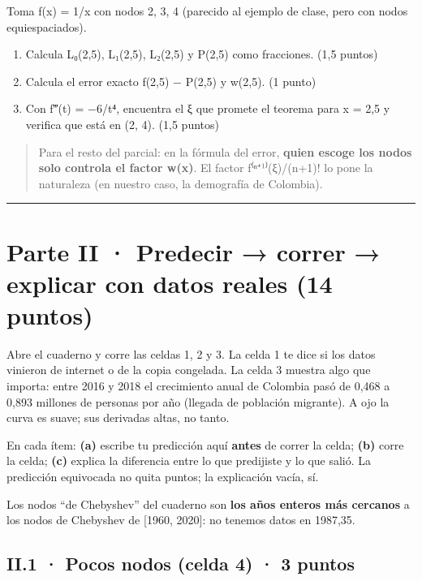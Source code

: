Toma f(x) = 1/x con nodos 2, 3, 4 (parecido al ejemplo de clase, pero con nodos equiespaciados).

\begin{enumerate}
\def\labelenumi{(\alph{enumi})}
\item
  Calcula L₀(2,5), L₁(2,5), L₂(2,5) y P(2,5) como fracciones. (1,5 puntos)
\item
  Calcula el error exacto f(2,5) − P(2,5) y w(2,5). (1 punto)
\item
  Con f‴(t) = −6/t⁴, encuentra el ξ que promete el teorema para x = 2,5 y verifica que está en (2, 4). (1,5 puntos)
\end{enumerate}

\begin{quote}
Para el resto del parcial: en la fórmula del error, \textbf{quien escoge los nodos solo controla el factor w(x)}. El factor f⁽ⁿ⁺¹⁾(ξ)/(n+1)! lo pone la naturaleza (en nuestro caso, la demografía de Colombia).
\end{quote}

\begin{center}\rule{0.5\linewidth}{0.5pt}\end{center}

\section{Parte II · Predecir → correr → explicar con datos reales (14 puntos)}

Abre el cuaderno y corre las celdas 1, 2 y 3. La celda 1 te dice si los datos vinieron de internet o de la copia congelada. La celda 3 muestra algo que importa: entre 2016 y 2018 el crecimiento anual de Colombia pasó de 0,468 a 0,893 millones de personas por año (llegada de población migrante). A ojo la curva es suave; sus derivadas altas, no tanto.

En cada ítem: \textbf{(a)} escribe tu predicción aquí \textbf{antes} de correr la celda; \textbf{(b)} corre la celda; \textbf{(c)} explica la diferencia entre lo que predijiste y lo que salió. La predicción equivocada no quita puntos; la explicación vacía, sí.

Los nodos ``de Chebyshev'' del cuaderno son \textbf{los años enteros más cercanos} a los nodos de Chebyshev de {[}1960, 2020{]}: no tenemos datos en 1987,35.

\subsection{II.1 · Pocos nodos (celda 4) · 3 puntos}

